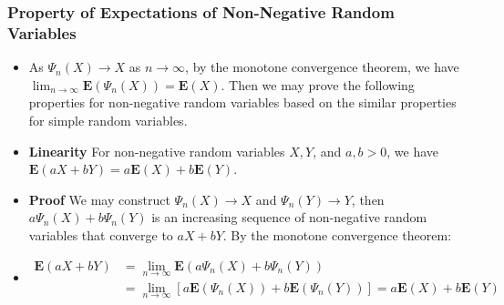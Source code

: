 \documentclass[handout]{beamer}
\newcommand{\BE}{\mathbf{E}}
\begin{document}
\frame
{
  \frametitle{Property of Expectations of Non-Negative Random Variables }

   \begin{itemize}


                         
\item<1-> As $\Psi_n(X)\rightarrow X$ as $n\rightarrow \infty$, by the monotone convergence theorem, we have $\lim_{n\rightarrow \infty} \BE(\Psi_n(X))=\BE(X)$. Then we may prove the following properties for non-negative random variables based on the similar properties for simple random variables.

\item<2->  \textbf{Linearity} For non-negative random variables $X, Y$, and $a, b>0$, we have $\BE(aX+bY)=a\BE(X)+b\BE(Y)$.

\item<3->[]\textbf{Proof} We may construct $\Psi_n(X)\rightarrow X$ and $\Psi_n(Y)\rightarrow Y$, then $a\Psi_n(X)+b\Psi_n(Y)$ is an increasing sequence of non-negative random variables that converge to $aX+bY$. By the monotone convergence theorem:

\item<4->[]
\begin{align*}\BE(aX+bY)& =\lim_{n\rightarrow \infty} \BE (a\Psi_n(X)+b\Psi_n(Y)) \\ 
& =\lim_{n\rightarrow \infty}[ a\BE(\Psi_n(X))+b\BE(\Psi_n(Y)) ]=a\BE(X)+b\BE(Y)
\end{align*}

\end{itemize}
}
\end{document}
